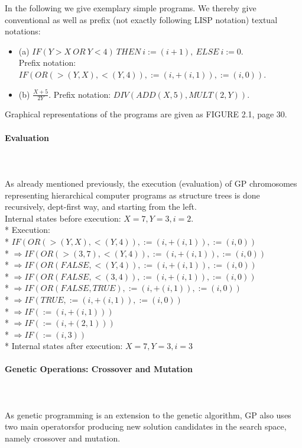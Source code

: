 \documentclass[12pt]{article}
\newcommand{\myparagraph}[1]{\paragraph{#1}\mbox{}\\\\}
\begin{document}
In the following we give exemplary simple programs. We thereby give conventional as well as prefix (not exactly following LISP notation) textual notations:
\begin{itemize}
\item (a) $IF (Y>X\ OR\ Y<4)\ THEN\ i:=(i+1),\ ELSE\ i:=0.$\\
Prefix notation: $IF(OR(>(Y,X),<(Y,4)),:=(i,+(i,1)),:=(i,0)).$
\item (b) $\frac{X+5}{2Y}.$ Prefix notation: $DIV(ADD(X,5),MULT(2,Y)).$
\end{itemize}
Graphical representations of the programs are given as FIGURE 2.1, page 30.
\myparagraph{Evaluation}
As already mentioned previously, the execution (evaluation) of GP chromosomes representing hierarchical computer programs as structure trees is done recursively, dept-first way, and starting from the left.\\
Internal states before execution: $X = 7, Y = 3, i = 2$.\\*
Execution:\\*
$IF(OR(>(Y,X),<(Y,4)),:=(i,+(i,1)),:=(i,0))$\\*
$\Rightarrow IF(OR(>(3,7),<(Y,4)),:=(i,+(i,1)),:=(i,0))$\\*
$\Rightarrow IF(OR(FALSE,<(Y,4)),:=(i,+(i,1)),:=(i,0))$\\*
$\Rightarrow IF(OR(FALSE,<(3,4)),:=(i,+(i,1)),:=(i,0))$\\*
$\Rightarrow IF(OR(FALSE,TRUE),:=(i,+(i,1)),:=(i,0))$\\*
$\Rightarrow IF(TRUE,:=(i,+(i,1)),:=(i,0))$\\*
$\Rightarrow IF(:=(i,+(i,1)))$\\*
$\Rightarrow IF(:=(i,+(2,1)))$\\*
$\Rightarrow IF(:=(i,3))$\\*
Internal states after execution: $X = 7, Y = 3, i = 3$
\myparagraph{Genetic Operations: Crossover and Mutation}
As genetic programming is an extension to the genetic algorithm, GP also uses two main operatorsfor producing new solution candidates in the search space, namely crossover and mutation.
\end{document}
